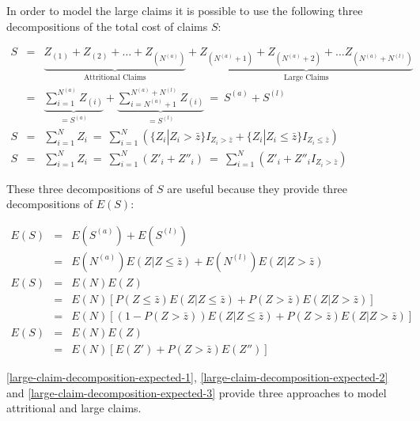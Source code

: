 \documentclass[a4paper, nobind]{templates/ociamthesis}
\theoremstyle{definition}
\theoremstyle{definition}
\theoremstyle{definition}
\theoremstyle{remark}
\begin{document}
In order to model the large claims it is possible to use the following three decompositions of the total cost of claims \(S\):

\begin{eqnarray}
  \nonumber
  S & = & \underbrace{Z_{(1)} + Z_{(2)} + \dots + Z_{(N^{(a)})}}_{\text{Attritional Claims}} +
        \underbrace{Z_{(N^{(a)} + 1)} + Z_{(N^{(a)} + 2)} + \dots Z_{(N^{(a)} + N^{(l)})}}_{\text{Large Claims}} \\
  \label{large-claim-decomposition-1}
    & = & \underbrace{\sum_{i=1}^{N^{(a)}}{Z_{(i)}}}_{=S^{(a)}} +
            \underbrace{\sum_{i = N^{(a)} + 1}^{N^{(a)} + N^{(l)}}{Z_{(i)}}}_{=S^{(l)}}
    \ = \ S^{(a)} + S^{(l)} \\[12pt]
  \label{large-claim-decomposition-2}
  S & = & \sum_{i=1}^{N}{Z_i}
    \ = \ \sum_{i=1}^{N}{\left(
      \{Z_i|Z_i>\bar{z}\} I_{Z_i>\bar{z}} +
      \{Z_i|Z_i\le\bar{z}\} I_{Z_i\le\bar{z}}
      \right)} \\[12pt]
  \label{large-claim-decomposition-3}
  S & = & \sum_{i=1}^{N}{Z_i}
    \ = \ \sum_{i=1}^{N}{\left(Z'_i + Z''_i\right)}
    \ = \ \sum_{i=1}^{N}{\left(Z'_i + Z''_i I_{Z_i > \bar{z}}\right)}
\end{eqnarray}

These three decompositions of \(S\) are useful because they provide three decompositions of \(E(S)\):

\begin{eqnarray}
  \nonumber
  E(S) & = & E(S^{(a)}) + E(S^{(l)}) \\
    \label{large-claim-decomposition-expected-1}
    & = & E(N^{(a)}) E(Z|Z\le\bar{z}) + E(N^{(l)}) E(Z|Z>\bar{z}) \\[12pt]
  \nonumber
  E(S) & = & E(N) E(Z) \\
    \nonumber
    & = & E(N) \left[P(Z\le\bar{z}) E(Z|Z\le\bar{z}) + P(Z>\bar{z}) E(Z|Z > \bar{z}) \right] \\
    \label{large-claim-decomposition-expected-2}
    & = & E(N) \left[\left( 1 - P(Z>\bar{z}) \right) E(Z|Z\le\bar{z}) + P(Z>\bar{z}) E(Z|Z > \bar{z})\right] \\[12pt]
  \nonumber
  E(S) & = & E(N) E(Z) \\
    \label{large-claim-decomposition-expected-3}
    & = & E(N) \left[E(Z') + P(Z>\bar{z}) E(Z'')\right]
\end{eqnarray}

\ref{large-claim-decomposition-expected-1}, \ref{large-claim-decomposition-expected-2} and \ref{large-claim-decomposition-expected-3} provide three approaches to model attritional and large claims.
\end{document}
